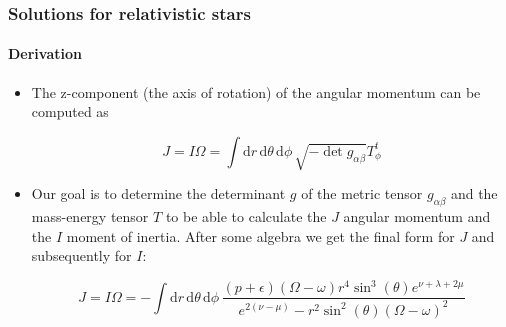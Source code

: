 \begin{frame}
\frametitle{Solutions for relativistic stars}
\framesubtitle{Derivation}

\begin{itemize}
	\item The z-component (the axis of rotation) of the angular momentum can be computed as
	\begin{block}{}
		\begin{equation}
			J
			=
			I \Omega
			=
			\int \mathrm{d}r\,\mathrm{d}\theta\,\mathrm{d}\phi\,
			\sqrt{- \det g_{\alpha \beta}} T^{t}_{\phi}
		\end{equation}
	\end{block}
	\item Our goal is to determine the determinant $g$ of the metric tensor $g_{\alpha \beta}$ and the mass-energy tensor $T$ to be able to calculate the $J$ angular momentum and the $I$ moment of inertia. After some algebra we get the final form for $J$ and subsequently for $I$:
	\begin{block}{}
		\begin{equation}
			J
			=
			I \Omega
			=
			- \int \mathrm{d}r\,\mathrm{d}\theta\,\mathrm{d}\phi\,
			\frac{
				\left( p + \epsilon \right) \left( \Omega - \omega \right) r^{4} \sin^{3} \left( \theta \right) e^{\nu + \lambda + 2 \mu}
			}{
				e^{2 \left( \nu - \mu \right)}
				-
				r^{2} \sin^{2} \left( \theta \right) \left( \Omega - \omega \right)^{2}
			}
		\end{equation}
	\end{block}
\end{itemize}

\end{frame}
